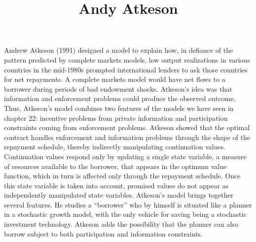 \documentclass[12pt]{article} %
\title{Andy Atkeson} %
\begin{document}
  \maketitle
  Andrew Atkeson (1991) designed a model to explain how, in defiance of the
  pattern predicted by complete markets models, low output realizations in various countries in the mid-1980s prompted international lenders to ask those
  countries for net repayments. A complete markets model would have net flows
  to a borrower during periods of bad endowment shocks. Atkeson’s idea was
  that information and enforcement problems could produce the observed outcome. Thus, Atkeson’s model combines two features of the models we have seen
  in chapter 22: incentive problems from private information and participation
  constraints coming from enforcement problems.
  Atkeson showed that the optimal contract handles enforcement and information problems through the shape of the repayment schedule, thereby indirectly
  manipulating continuation values. Continuation values respond only by updating  a single state variable, a measure of resources available to the borrower, that
  appears in the optimum value function, which in turn is aﬀected only through
  the repayment schedule. Once this state variable is taken into account, promised
  values do not appear as independently manipulated state variables. 
  Atkeson’s model brings together several features. He studies a “borrower”
  who by himself is situated like a planner in a stochastic growth model, with the
  only vehicle for saving being a stochastic investment technology. Atkeson adds
  the possibility that the planner can also borrow subject to both participation
  and information constraints.

 
\end{document}
